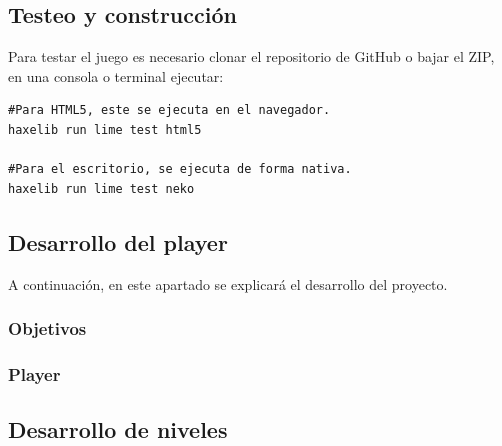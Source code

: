 \documentclass[11pt]{article}
\begin{document}
\subsection{Testeo y construcción}
\label{sec:org53c0995}
Para testar el juego es necesario clonar el repositorio de GitHub o bajar el ZIP,
en una consola o terminal ejecutar:
\begin{verbatim}
#Para HTML5, este se ejecuta en el navegador.
haxelib run lime test html5

#Para el escritorio, se ejecuta de forma nativa.
haxelib run lime test neko
\end{verbatim}
\subsection{Desarrollo del player}
\label{sec:org4d51fda}
A continuación, en este apartado se explicará el desarrollo del proyecto.
\subsubsection{Objetivos}
\label{sec:orga025d57}
\subsubsection{Player}
\label{sec:org325fd3b}
\subsection{Desarrollo de niveles}
\label{sec:org9d97279}
\end{document}
